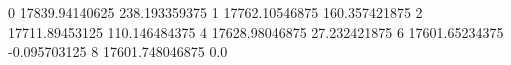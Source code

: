 0 17839.94140625 238.193359375
1 17762.10546875 160.357421875
2 17711.89453125 110.146484375
4 17628.98046875 27.232421875
6 17601.65234375 -0.095703125
8 17601.748046875 0.0
